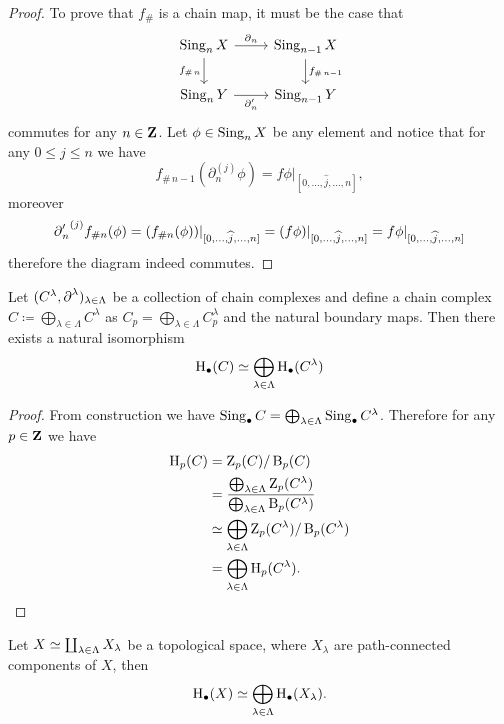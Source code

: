 \begin{proof}
To prove that \(f_{\#}\) is a chain map, it must be the case that
\[
\begin{tikzcd}
\Sing_n X \ar[d, "f_{\#\, n}"'] \ar[r, "\face_n"]
&\Sing_{n-1} X \ar[d, "f_{\#\, n-1}"]
\\
\Sing_n Y \ar[r, "\face_n'"']
&\Sing_{n-1} Y
\end{tikzcd}
\]
commutes for any \(n \in \mathbf{Z}\). Let \(\phi \in \operatorname{Sing}_n X\) be any element and
notice that for any \(0 \leq j \leq n\) we have
\[
f_{\#\, n-1}(\partial_n^{(j)} \phi)
= f \phi|_{[0, \dots, \widehat j, \dots, n]},
\]
moreover
\[
{\operatorname{\partial}_n'}^{(j)} f_{\# n}(\phi)
= (f_{\# n} (\phi))|_{[0, \dots, \widehat j, \dots, n]}
= (f \phi)|_{[0, \dots, \widehat j, \dots, n]}
= f \phi|_{[0, \dots, \widehat j, \dots, n]}
\]
therefore the diagram indeed commutes.
\end{proof}

\begin{proposition}
\label{prop:direct-sum-of-chain-complexes}
Let \((C^{\lambda}, \operatorname{\partial}^{\lambda})_{\lambda \in \Lambda}\) be a collection of chain
complexes and define a chain complex \(C \coloneq \bigoplus_{\lambda \in
  \Lambda} C^{\lambda}\) as \(C_p = \bigoplus_{\lambda \in \Lambda}
C_p^{\lambda}\) and the natural boundary maps. Then there exists a natural isomorphism
\[
\operatorname{H}_{\bullet}(C) \simeq \bigoplus_{\lambda \in \Lambda} \operatorname{H}_{\bullet}(C^{\lambda})
\]
\end{proposition}

\begin{proof}
From construction we have
\(\operatorname{Sing}_{\bullet} C = \bigoplus_{\lambda \in \Lambda} \operatorname{Sing}_{\bullet}
C^{\lambda}\). Therefore for any \(p \in \mathbf{Z}\) we have
\begin{align*}
  \operatorname{H}_p(C)
  &= \operatorname{Z}_p(C)/\operatorname{B}_p(C) \\
  &= \frac{\bigoplus_{\lambda \in
    \Lambda}\operatorname{Z}_p(C^{\lambda})}{\bigoplus_{\lambda \in \Lambda}\operatorname{B}_p(C^{\lambda})}
  \\
  &\simeq \bigoplus_{\lambda \in \Lambda} \operatorname{Z}_p(C^{\lambda})/\operatorname{B}_p(C^{\lambda}) \\
  &= \bigoplus_{\lambda \in \Lambda} \operatorname{H}_p(C^{\lambda}).
\end{align*}
\end{proof}

\begin{proposition}
\label{prop:coprod-space-decomposition-homology-group}
Let \(X \simeq \coprod_{\lambda \in \Lambda} X_{\lambda}\) be a topological
space, where \(X_{\lambda}\) are path-connected components of \(X\), then
\[
\operatorname{H}_{\bullet}(X) \simeq \bigoplus_{\lambda \in \Lambda} \operatorname{H}_{\bullet}(X_{\lambda}).
\]
\end{proposition}

